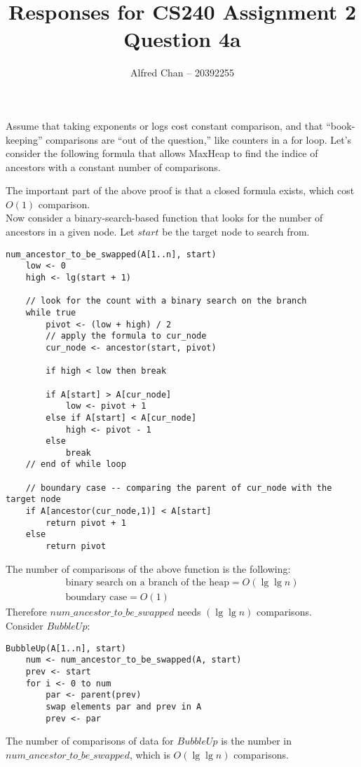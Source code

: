 \documentclass[12pt]{article}
\title{Responses for CS240 Assignment 2 Question 4a}
\author{Alfred Chan -- 20392255}
\begin{document}
\maketitle

Assume that taking exponents or logs cost constant comparison, and that ``book-keeping'' comparisons are ``out of the question,'' like counters in a for loop.
Let's consider the following formula that allows MaxHeap to find the indice of ancestors with a constant number of comparisons.

The important part of the above proof is that a closed formula exists, which cost $O(1)$ comparison.\\
Now consider a binary-search-based function that looks for the number of ancestors in a given node. Let $start$ be the target node to search from.
\begin{lstlisting}
num_ancestor_to_be_swapped(A[1..n], start)
	low <- 0
	high <- lg(start + 1)

	// look for the count with a binary search on the branch
	while true
		pivot <- (low + high) / 2
		// apply the formula to cur_node
		cur_node <- ancestor(start, pivot)

		if high < low then break

		if A[start] > A[cur_node]
			low <- pivot + 1
		else if A[start] < A[cur_node]
			high <- pivot - 1
		else
			break
	// end of while loop

	// boundary case -- comparing the parent of cur_node with the target node
	if A[ancestor(cur_node,1)] < A[start]
		return pivot + 1
	else
		return pivot
\end{lstlisting}
The number of comparisons of the above function is the following:
\begin{align*}
\text{binary search on a branch of the heap} = O(\lg\lg n)\\
\text{boundary case} = O(1)
\end{align*}
Therefore $num\_ancestor\_to\_be\_swapped$ needs $(\lg\lg n)$ comparisons.\\
Consider $BubbleUp$:
\begin{lstlisting}
BubbleUp(A[1..n], start)
	num <- num_ancestor_to_be_swapped(A, start)
	prev <- start
	for i <- 0 to num
		par <- parent(prev)
		swap elements par and prev in A
		prev <- par
\end{lstlisting}
The number of comparisons of data for $BubbleUp$ is the number in $num\_ancestor\_to\_be\_swapped$, which is $O(\lg\lg n)$ comparisons.
\end{document}
